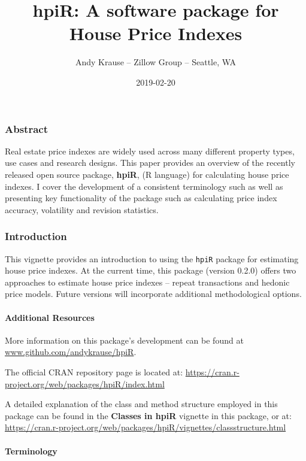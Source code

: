 \documentclass[]{article}
\title{hpiR: A software package for House Price Indexes}
\author{Andy Krause -- Zillow Group -- Seattle, WA}
\date{2019-02-20}
\let\oldparagraph\paragraph
\renewcommand{\paragraph}[1]{\oldparagraph{#1}\mbox{}}
\begin{document}
\maketitle

\subsubsection{Abstract}\label{abstract}

Real estate price indexes are widely used across many different property
types, use cases and research designs. This paper provides an overview
of the recently released open source package, \textbf{hpiR}, (R
language) for calculating house price indexes. I cover the development
of a consistent terminology such as well as presenting key functionality
of the package such as calculating price index accuracy, volatility and
revision statistics.

\subsubsection{Introduction}\label{introduction}

This vignette provides an introduction to using the \texttt{hpiR}
package for estimating house price indexes. At the current time, this
package (version 0.2.0) offers two approaches to estimate house price
indexes -- repeat transactions and hedonic price models. Future versions
will incorporate additional methodological options.

\paragraph{Additional Resources}\label{additional-resources}

More information on this package's development can be found at
\href{https://www.github.com/andykrause/hpiR}{www.github.com/andykrause/hpiR}.

The official CRAN repository page is located at:
\url{https://cran.r-project.org/web/packages/hpiR/index.html}

A detailed explanation of the class and method structure employed in
this package can be found in the \textbf{Classes in hpiR} vignette in
this package, or at:
\url{https://cran.r-project.org/web/packages/hpiR/vignettes/classstructure.html}

\paragraph{Terminology}\label{terminology}
\end{document}
